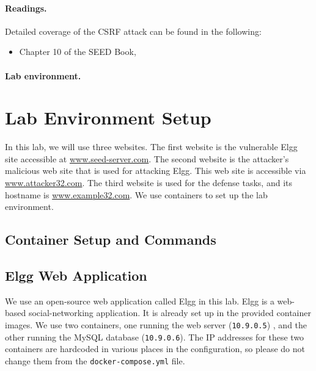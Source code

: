 \paragraph{Readings.}
Detailed coverage of the CSRF attack can be found in the following:

\begin{itemize}
\item Chapter 10 of the SEED Book, \seedbook
\end{itemize}


\paragraph{Lab environment.} 
\seedenvironmentB 
\nodependency



\section{Lab Environment Setup}

In this lab, we will use three websites. 
The first website is the vulnerable Elgg
site accessible at \url{www.seed-server.com}. The second
website is the attacker's malicious web site that is used for
attacking Elgg.  This web site is accessible via
\url{www.attacker32.com}.  The third website is used 
for the defense tasks, and its hostname
is \url{www.example32.com}. 
We use containers to
set up the lab environment. 


\subsection{Container Setup and Commands}




\subsection{Elgg Web Application}

We use an open-source web application called Elgg in this lab.
Elgg is a web-based social-networking application.
It is already set up in the provided container images.
We use two containers, one running the web server (\texttt{10.9.0.5}) ,
and the other running the MySQL database (\texttt{10.9.0.6}).
The IP addresses for these two containers are hardcoded in various
places in the configuration, so please do not change them from
the \texttt{docker-compose.yml} file.

